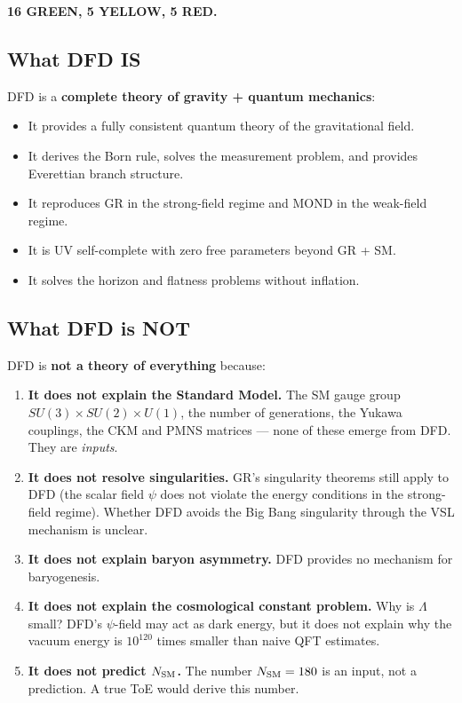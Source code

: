 \documentclass[11pt,a4paper]{article}
\begin{document}
\textbf{16 GREEN, 5 YELLOW, 5 RED.}

\subsection{What DFD IS}

DFD is a \textbf{complete theory of gravity + quantum mechanics}:
\begin{itemize}
\item It provides a fully consistent quantum theory of the gravitational field.
\item It derives the Born rule, solves the measurement problem, and provides Everettian branch structure.
\item It reproduces GR in the strong-field regime and MOND in the weak-field regime.
\item It is UV self-complete with zero free parameters beyond GR + SM.
\item It solves the horizon and flatness problems without inflation.
\end{itemize}

\subsection{What DFD is NOT}

DFD is \textbf{not a theory of everything} because:
\begin{enumerate}
\item \textbf{It does not explain the Standard Model.} The SM gauge group $SU(3) \times SU(2) \times U(1)$, the number of generations, the Yukawa couplings, the CKM and PMNS matrices --- none of these emerge from DFD. They are \emph{inputs}.

\item \textbf{It does not resolve singularities.} GR's singularity theorems still apply to DFD (the scalar field $\psi$ does not violate the energy conditions in the strong-field regime). Whether DFD avoids the Big Bang singularity through the VSL mechanism is unclear.

\item \textbf{It does not explain baryon asymmetry.} DFD provides no mechanism for baryogenesis.

\item \textbf{It does not explain the cosmological constant problem.} Why is $\Lambda$ small? DFD's $\psi$-field may act as dark energy, but it does not explain why the vacuum energy is $10^{120}$ times smaller than naive QFT estimates.

\item \textbf{It does not predict $N_{\rm SM}$.} The number $N_{\rm SM} = 180$ is an input, not a prediction. A true ToE would derive this number.
\end{enumerate}
\end{document}
